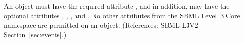 An \Event object must have the required attribute
, and in addition, may have the optional
attributes  , , , and .
No other attributes from the SBML Level~3 Core namespace are permitted on
an \Event object.  (References: SBML L3V2 Section~\ref{sec:events}.)
